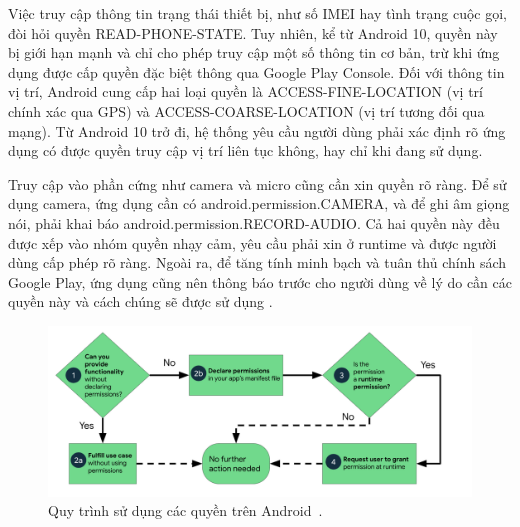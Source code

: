 \vspace{0.5em}

Việc truy cập thông tin trạng thái thiết bị, như số IMEI hay tình trạng cuộc gọi, đòi hỏi quyền READ-PHONE-STATE. Tuy nhiên, kể từ Android 10, quyền này bị giới hạn mạnh và chỉ cho phép truy cập một số thông tin cơ bản, trừ khi ứng dụng được cấp quyền đặc biệt thông qua Google Play Console. Đối với thông tin vị trí, Android cung cấp hai loại quyền là ACCESS-FINE-LOCATION (vị trí chính xác qua GPS) và ACCESS-COARSE-LOCATION (vị trí tương đối qua mạng). Từ Android 10 trở đi, hệ thống yêu cầu người dùng phải xác định rõ ứng dụng có được quyền truy cập vị trí liên tục không, hay chỉ khi đang sử dụng.

\vspace{0.5em}

Truy cập vào phần cứng như camera và micro cũng cần xin quyền rõ ràng. Để sử dụng camera, ứng dụng cần có android.permission.CAMERA, và để ghi âm giọng nói, phải khai báo android.permission.RECORD-AUDIO. Cả hai quyền này đều được xếp vào nhóm quyền nhạy cảm, yêu cầu phải xin ở runtime và được người dùng cấp phép rõ ràng. Ngoài ra, để tăng tính minh bạch và tuân thủ chính sách Google Play, ứng dụng cũng nên thông báo trước cho người dùng về lý do cần các quyền này và cách chúng sẽ được sử dụng \cite{permission}.
    
\begin{figure}[H] 
        \centering
            \includegraphics[width=1\textwidth]{images/permission.png}
            \caption{Quy trình sử dụng các quyền trên Android~\cite{runtime-permissions}.}
            \label{fig:android1}
\end{figure} 

